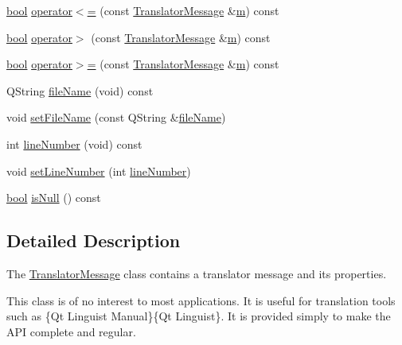 \begin{DoxyCompactItemize}
\item 
\hyperlink{compiler_8h_abb452686968e48b67397da5f97445f5b}{bool} \hyperlink{classTranslatorMessage_a07a75dfdfdba3fc9f1c6fd2d08b13ab0}{operator$<$=} (const \hyperlink{classTranslatorMessage}{Translator\+Message} \&\hyperlink{indexexpr_8h_ab72fdb4031d47b75ab26dd18a437bcdc}{m}) const 
\item 
\hyperlink{compiler_8h_abb452686968e48b67397da5f97445f5b}{bool} \hyperlink{classTranslatorMessage_a6f7215ff1188c3e4b0e53ba0ce966fcb}{operator$>$} (const \hyperlink{classTranslatorMessage}{Translator\+Message} \&\hyperlink{indexexpr_8h_ab72fdb4031d47b75ab26dd18a437bcdc}{m}) const 
\item 
\hyperlink{compiler_8h_abb452686968e48b67397da5f97445f5b}{bool} \hyperlink{classTranslatorMessage_ac78db1093a6ea1fed5c866df8691e622}{operator$>$=} (const \hyperlink{classTranslatorMessage}{Translator\+Message} \&\hyperlink{indexexpr_8h_ab72fdb4031d47b75ab26dd18a437bcdc}{m}) const 
\item 
Q\+String \hyperlink{classTranslatorMessage_a215130997a8e69215669c319162de60d}{file\+Name} (void) const 
\item 
void \hyperlink{classTranslatorMessage_a3a72a0806d9804ba967e55a5692f8f62}{set\+File\+Name} (const Q\+String \&\hyperlink{classTranslatorMessage_a215130997a8e69215669c319162de60d}{file\+Name})
\item 
int \hyperlink{classTranslatorMessage_a321cbc7d11b8d11cbe6d51df73a564b7}{line\+Number} (void) const 
\item 
void \hyperlink{classTranslatorMessage_acc65257423076b14e2711b2d2e655223}{set\+Line\+Number} (int \hyperlink{classTranslatorMessage_a321cbc7d11b8d11cbe6d51df73a564b7}{line\+Number})
\item 
\hyperlink{compiler_8h_abb452686968e48b67397da5f97445f5b}{bool} \hyperlink{classTranslatorMessage_a533ecc10ed42c4788b19c75556419346}{is\+Null} () const 
\end{DoxyCompactItemize}


\subsection{Detailed Description}
The \hyperlink{classTranslatorMessage}{Translator\+Message} class contains a translator message and its properties. 

This class is of no interest to most applications. It is useful for translation tools such as \{Qt Linguist Manual\}\{Qt Linguist\}. It is provided simply to make the A\+P\+I complete and regular.

